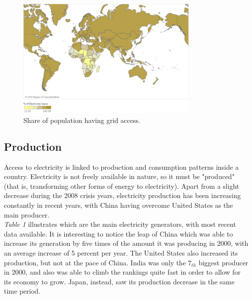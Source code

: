\documentclass{book}
\begin{document}
\bigskip
\begin{figure}[H]
\begin{center}
\captionsetup{justification=centering}
\includegraphics[width=0.8\textwidth]{Images/access.png}
\caption{Share of population having grid access. }
\end{center}
\end{figure}
\bigskip

\subsection*{Production}

Access to electricity is linked to production and consumption patterns inside a country. Electricity is not freely available in nature, so it must be "produced" (that is, transforming other forms of energy to electricity). Apart from a slight decrease during the 2008 crisis years, electricity production has been increasing constantly in recent years, with China having overcome United States as the main producer.\\

\textit{Table 1} illustrates which are the main electricity generators, with most recent data available. It is interesting to notice the leap of China which was able to increase its generation by five times of the amount it was producing in 2000, with an average increase of 5 percent per year. The United States also increased its production, but not at the pace of China. India was only the $7_{th}$ biggest producer in 2000, and also was able to climb the rankings quite fast in order to allow for its economy to grow. Japan, instead, saw its production decrease in the same time period.
\end{document}
